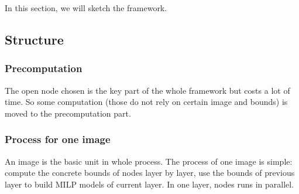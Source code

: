 \documentclass{llncs}
\begin{document}
In this section, we will sketch the framework. 

\subsection{Structure}

\subsubsection*{Precomputation}

The open node chosen is the key part of the whole framework but costs a lot of time. So some computation (those do not rely on certain image and bounds) is moved to the precomputation part.

%



\subsubsection*{Process for one image} An image is the basic unit in whole process. The process of one image is simple: compute the concrete bounds of nodes layer by layer, use the bounds of previous layer to build MILP models of current layer. In one layer, nodes runs in parallel.






%
%
\end{document}
